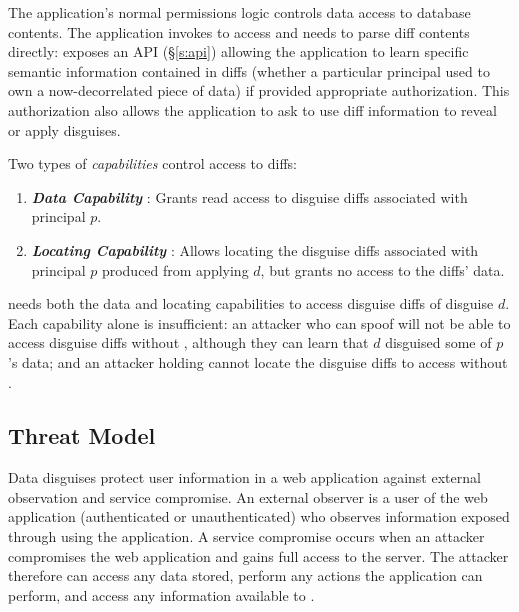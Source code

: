 The application's normal permissions logic controls data access to database contents. The
application invokes \sys to access and needs to parse diff contents directly: \sys exposes an API
(\S\ref{s:api}) allowing the application to learn specific semantic information contained in diffs
(\eg whether a particular principal used to own a now-decorrelated piece of data) if provided
appropriate authorization. This authorization also allows the application to ask \sys to use diff
information to reveal or apply disguises.

\vspace{6pt}\noindent
Two types of \emph{capabilities} control access to diffs:
\begin{enumerate}
    \item \emph{\textbf{Data Capability }}: Grants read access to disguise diffs 
        associated with principal $p$.
    \item \emph{\textbf{Locating Capability }}: Allows locating the disguise
        diffs associated with principal $p$ produced from applying $d$, but grants no 
        access to the diffs' data.
\end{enumerate}

\noindent \sys needs both the data and locating capabilities  to access
disguise diffs of disguise $d$. Each capability alone is insufficient: an attacker who can spoof
 will not be able to access disguise diffs without , although they can learn
that $d$ disguised some of $p$'s data; and an attacker holding  cannot locate the disguise
diffs to access without .

\subsection{Threat Model}
\label{s:threat}

%
Data disguises protect user information in a web application against external observation
and service compromise.
%
An external observer is a user of the web application (authenticated or unauthenticated) who
observes information exposed through using the application.
%
A service compromise occurs when an attacker compromises the web application and 
gains full access to the server.
%
The attacker therefore can access any data stored, perform any actions the application can
perform, and access any information available to \sys.
%

